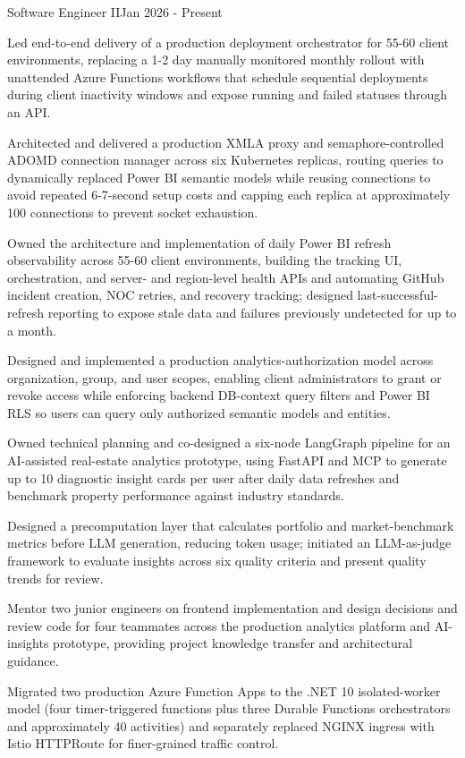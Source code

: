 \resumePositionHeading
{Software Engineer II}{Jan 2026 - Present}
\vspace{1.5mm}
\resumeItemListStart
    \item{Led end-to-end delivery of a production deployment orchestrator for 55-60 client environments, replacing a 1-2 day manually monitored monthly rollout with unattended Azure Functions workflows that schedule sequential deployments during client inactivity windows and expose running and failed statuses through an API.}
    \item{Architected and delivered a production XMLA proxy and semaphore-controlled ADOMD connection manager across six Kubernetes replicas, routing queries to dynamically replaced Power BI semantic models while reusing connections to avoid repeated 6-7-second setup costs and capping each replica at approximately 100 connections to prevent socket exhaustion.}
    \item{Owned the architecture and implementation of daily Power BI refresh observability across 55-60 client environments, building the tracking UI, orchestration, and server- and region-level health APIs and automating GitHub incident creation, NOC retries, and recovery tracking; designed last-successful-refresh reporting to expose stale data and failures previously undetected for up to a month.}
    \item{Designed and implemented a production analytics-authorization model across organization, group, and user scopes, enabling client administrators to grant or revoke access while enforcing backend DB-context query filters and Power BI RLS so users can query only authorized semantic models and entities.}
    \item{Owned technical planning and co-designed a six-node LangGraph pipeline for an AI-assisted real-estate analytics prototype, using FastAPI and MCP to generate up to 10 diagnostic insight cards per user after daily data refreshes and benchmark property performance against industry standards.}
    \item{Designed a precomputation layer that calculates portfolio and market-benchmark metrics before LLM generation, reducing token usage; initiated an LLM-as-judge framework to evaluate insights across six quality criteria and present quality trends for review.}
    \item{Mentor two junior engineers on frontend implementation and design decisions and review code for four teammates across the production analytics platform and AI-insights prototype, providing project knowledge transfer and architectural guidance.}
    \item{Migrated two production Azure Function Apps to the .NET 10 isolated-worker model (four timer-triggered functions plus three Durable Functions orchestrators and approximately 40 activities) and separately replaced NGINX ingress with Istio HTTPRoute for finer-grained traffic control.}
\resumeItemListEnd
